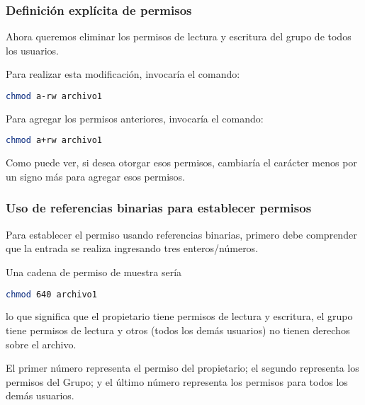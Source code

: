 \begin{frame}[fragile]
  \frametitle{Definición explícita de permisos}
  Ahora queremos eliminar los permisos de lectura y escritura del grupo de
  todos los usuarios.

  \vspace{\baselineskip}
  Para realizar esta modificación, invocaría el comando:

  \begin{lstlisting}[language=Bash]
chmod a-rw archivo1
  \end{lstlisting}

  \pausa
  \vspace{\baselineskip}
  Para agregar los permisos anteriores, invocaría el comando:

  \begin{lstlisting}[language=Bash]
chmod a+rw archivo1
  \end{lstlisting}

  \vspace{\baselineskip}
  Como puede ver, si desea otorgar esos permisos, cambiaría el carácter
  menos por un signo más para agregar esos permisos.
\end{frame}

\begin{frame}[fragile]
  \frametitle{Uso de referencias binarias para establecer permisos}
  Para establecer el permiso usando referencias binarias, primero debe
  comprender que la entrada se realiza ingresando tres enteros/números.

  \vspace{\baselineskip}
  Una cadena de permiso de muestra sería
  \begin{lstlisting}[language=Bash]
chmod 640 archivo1
  \end{lstlisting}
  lo que significa que el propietario tiene permisos de lectura y escritura,
  el grupo tiene permisos de lectura y otros (todos los demás usuarios) no
  tienen derechos sobre el archivo.

  \vspace{\baselineskip}
  El primer número representa el permiso del propietario; el segundo
  representa los permisos del Grupo; y el último número representa los
  permisos para todos los demás usuarios.
\end{frame}

